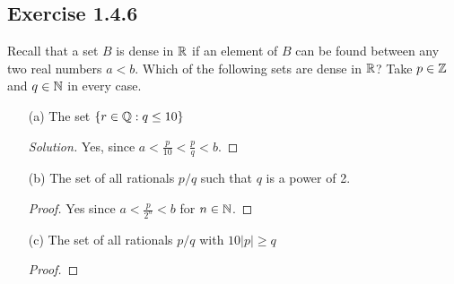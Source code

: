     \subsection{Exercise 1.4.6}
    Recall that a set \( B \) is dense in \( \mathbb{R} \) if an element of \( B \) can be found between any two real numbers \( a < b \). Which of the following sets are dense in \( \mathbb{R} \)? Take \( p \in \mathbb{Z} \) and \( q \in \mathbb{N} \) in every case. 
    \begin{enumerate}
        \item[(a)]
        The set \( \{ r \in \mathbb{Q} : q \leq 10  \} \)
        \begin{proof}[Solution]
            Yes, since \( a < \frac{p}{10} < \frac{p}{q} < b \). 
            
        \end{proof}
        
        \item[(b)]
        The set of all rationals \( p/q \) such that \( q \) is a power of 2.
        \begin{proof}
            Yes since \( a < \frac{p}{2^n} < b \) for \( n \in \mathbb{N} \). 
        \end{proof}
        
        \item[(c)] 
        The set of all rationals \( p/q \) with \( 10|p| \geq q \)
            \begin{proof}
                
            \end{proof}
        
    \end{enumerate}







